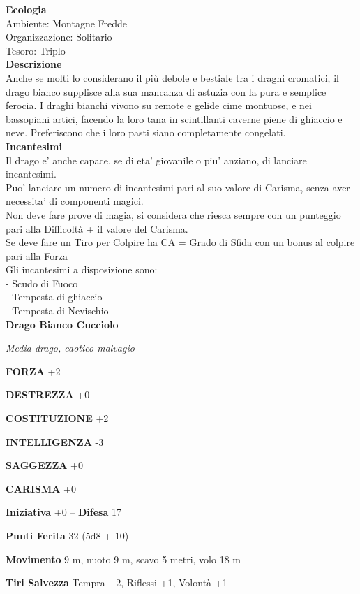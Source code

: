 \begin{multicols}{2}
\textbf{Ecologia}\\
Ambiente: Montagne Fredde\\
Organizzazione: Solitario\\
Tesoro: Triplo\\
\textbf{Descrizione}\\
Anche se molti lo considerano il più debole e bestiale tra i draghi cromatici, il drago bianco supplisce alla sua mancanza di astuzia con la pura e semplice ferocia. I draghi bianchi vivono su remote e gelide cime montuose, e nei bassopiani artici, facendo la loro tana in scintillanti caverne piene di ghiaccio e neve. Preferiscono che i loro pasti siano completamente congelati.\\
\textbf{Incantesimi}\\
Il drago e' anche capace, se di eta' giovanile o piu' anziano, di lanciare incantesimi.\\
Puo' lanciare un numero di incantesimi pari al suo valore di Carisma, senza aver necessita' di componenti magici.\\
Non deve fare prove di magia, si considera che riesca sempre con un punteggio pari alla Difficoltà + il valore del Carisma.\\
Se deve fare un Tiro per Colpire ha CA = Grado di Sfida con un bonus al colpire pari alla Forza\\
Gli incantesimi a disposizione sono:\\
- Scudo di Fuoco\\
- Tempesta di ghiaccio\\
- Tempesta di Nevischio\\


\medskip{}\textbf{Drago Bianco Cucciolo}

\emph{Media drago, caotico malvagio}

\textbf{FORZA} +2

\textbf{DESTREZZA} +0

\textbf{COSTITUZIONE} +2

\textbf{INTELLIGENZA} -3

\textbf{SAGGEZZA} +0

\textbf{CARISMA} +0

\textbf{Iniziativa} +0 -- \textbf{Difesa} 17

\textbf{Punti Ferita} 32 (5d8 + 10)

\textbf{Movimento} 9 m, nuoto 9 m, scavo 5 metri, volo 18 m

\textbf{Tiri Salvezza} Tempra +2, Riflessi +1, Volontà +1


\end{multicols}

